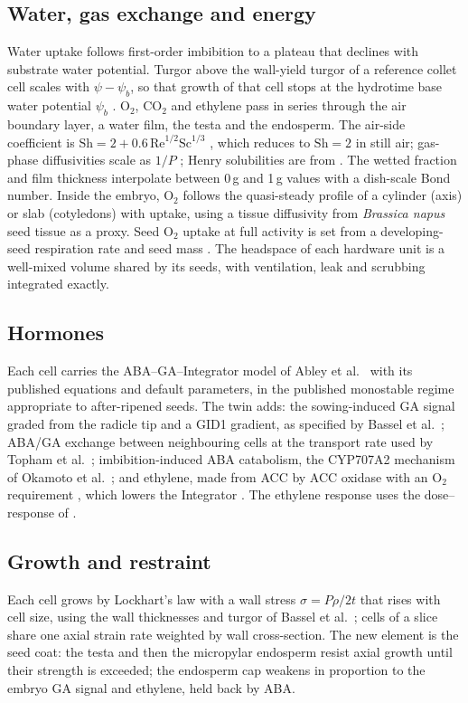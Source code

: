 \documentclass[11pt]{article}
\begin{document}
\subsection{Water, gas exchange and energy}
Water uptake follows first-order imbibition to a plateau that declines with substrate water potential. Turgor above the wall-yield
turgor of a reference collet cell scales with $\psi-\psi_b$, so that growth of that cell stops at the hydrotime base water potential
$\psi_b$ \citep{footitt2019}. O$_2$, CO$_2$ and ethylene pass in series through the air boundary layer, a water film, the testa and
the endosperm. The air-side coefficient is $\mathrm{Sh}=2+0.6\,\mathrm{Re}^{1/2}\mathrm{Sc}^{1/3}$ \citep{stiti2022}, which reduces
to $\mathrm{Sh}=2$ in still air; gas-phase diffusivities scale as $1/P$ \citep{tang2014,tang2015}; Henry solubilities are from
\citep{sander2015}. The wetted fraction and film thickness interpolate between 0\,g and 1\,g values with a dish-scale Bond number.
Inside the embryo, O$_2$ follows the quasi-steady profile of a cylinder (axis) or slab (cotyledons) with uptake, using a tissue
diffusivity from \emph{Brassica napus} seed tissue \citep{verboven2013} as a proxy. Seed O$_2$ uptake at full activity is set from a
developing-seed respiration rate \citep{thiel2011} and seed mass \citep{klasen2025}. The headspace of each hardware unit is a
well-mixed volume shared by its seeds, with ventilation, leak and scrubbing integrated exactly.

\subsection{Hormones}
Each cell carries the ABA--GA--Integrator model of Abley et al.~\citep{abley2021} with its published equations and default
parameters, in the published monostable regime appropriate to after-ripened seeds. The twin adds: the sowing-induced GA signal graded
from the radicle tip and a GID1 gradient, as specified by Bassel et al.~\citep{bassel2014}; ABA/GA exchange between neighbouring cells
at the transport rate used by Topham et al.~\citep{topham2017}; imbibition-induced ABA catabolism, the CYP707A2 mechanism of
Okamoto et al.~\citep{okamoto2006}; and ethylene, made from ACC by ACC oxidase with an O$_2$ requirement
\citep{dilley2013,thrower2001}, which lowers the Integrator \citep{wang2018}. The ethylene response uses the dose--response of
\citep{wang2018}.

\subsection{Growth and restraint}
Each cell grows by Lockhart's law with a wall stress $\sigma=P\rho/2t$ that rises with cell size, using the wall thicknesses and turgor
of Bassel et al.~\citep{bassel2014}; cells of a slice share one axial strain rate weighted by wall cross-section. The new element is the
seed coat: the testa and then the micropylar endosperm resist axial growth until their strength is exceeded; the endosperm cap weakens
in proportion to the embryo GA signal and ethylene, held back by ABA.
\end{document}
